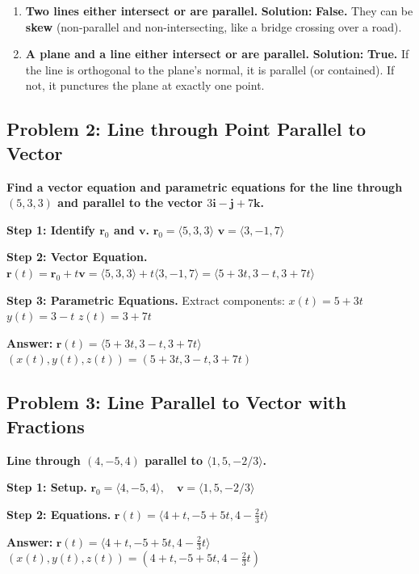 \documentclass[11pt]{article}
\begin{document}
\begin{enumerate}[label=(\alph*)]
    \item \textbf{Two lines either intersect or are parallel.}
    \textbf{Solution:} \textbf{False.} They can be \textbf{skew} (non-parallel and non-intersecting, like a bridge crossing over a road).

    \item \textbf{A plane and a line either intersect or are parallel.}
    \textbf{Solution:} \textbf{True.} If the line is orthogonal to the plane's normal, it is parallel (or contained). If not, it punctures the plane at exactly one point.
\end{enumerate}

\hrulefill

\subsection*{Problem 2: Line through Point Parallel to Vector}
\textbf{Find a vector equation and parametric equations for the line through $(5, 3, 3)$ and parallel to the vector $3\mathbf{i} - \mathbf{j} + 7\mathbf{k}$.}

\textbf{Step 1: Identify $\mathbf{r}_0$ and $\mathbf{v}$.}
$\mathbf{r}_0 = \langle 5, 3, 3 \rangle$
$\mathbf{v} = \langle 3, -1, 7 \rangle$

\textbf{Step 2: Vector Equation.}
$\mathbf{r}(t) = \mathbf{r}_0 + t\mathbf{v} = \langle 5, 3, 3 \rangle + t\langle 3, -1, 7 \rangle = \langle 5+3t, 3-t, 3+7t \rangle$

\textbf{Step 3: Parametric Equations.}
Extract components:
$x(t) = 5 + 3t$
$y(t) = 3 - t$
$z(t) = 3 + 7t$

\textbf{Answer:}
$\mathbf{r}(t) = \langle 5+3t, 3-t, 3+7t \rangle$
$(x(t), y(t), z(t)) = (5+3t, 3-t, 3+7t)$

\hrulefill

\subsection*{Problem 3: Line Parallel to Vector with Fractions}
\textbf{Line through $(4, -5, 4)$ parallel to $\langle 1, 5, -2/3 \rangle$.}

\textbf{Step 1: Setup.}
$\mathbf{r}_0 = \langle 4, -5, 4 \rangle, \quad \mathbf{v} = \langle 1, 5, -2/3 \rangle$

\textbf{Step 2: Equations.}
$\mathbf{r}(t) = \langle 4+t, -5+5t, 4 - \frac{2}{3}t \rangle$

\textbf{Answer:}
$\mathbf{r}(t) = \langle 4+t, -5+5t, 4 - \frac{2}{3}t \rangle$
$(x(t), y(t), z(t)) = (4+t, -5+5t, 4 - \frac{2}{3}t)$
\end{document}
